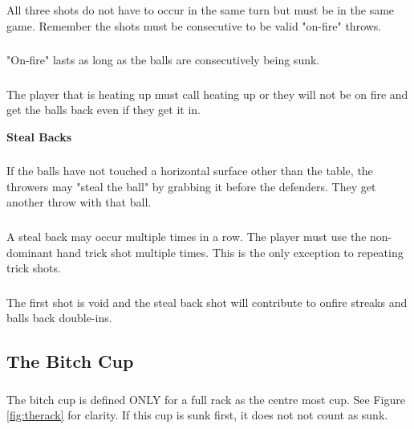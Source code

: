 		\subsubsection{}\label{sssec:BallsBack,onfire_reset}
			All three shots do not have to occur in the same turn but must be in the same game. Remember the shots must be consecutive to be valid "on-fire" throws.
		\subsubsection{}\label{sssec:BallsBack,onfire_multiple}
			"On-fire" lasts as long as the balls are consecutively being sunk. 
		\subsubsection{}\label{sssec:BallsBack,onfire_calling}
			The player that is heating up must call heating up or they will not be on fire and get the balls back even if they get it in.
		
    \noindent\textbf{Steal Backs}
		\subsubsection{}\label{sssec:BallsBack,stealback}
			If the balls have not touched a horizontal surface other than the table, the throwers may "steal the ball" by grabbing it before the defenders.
            They get another throw with that ball.
		\subsubsection{}\label{sssec:BallsBack,stealback_multi}
			A steal back may occur multiple times in a row.
            The player must use the non-dominant hand trick shot multiple times. This is the only exception to repeating trick shots.
        \subsubsection{}\label{sssec:BallsBack,stealback_redo}
            The first shot is void and the steal back shot will contribute to onfire streaks and balls back double-ins.

	\subsection{The Bitch Cup}\label{ssec:BitchCup}
		\subsubsection{}\label{sssec:BitchCup,def}
			The bitch cup is defined ONLY for a full rack as the centre most cup.
            See Figure \ref{fig:therack} for clarity. If this cup is sunk first, it does not not count as sunk.
